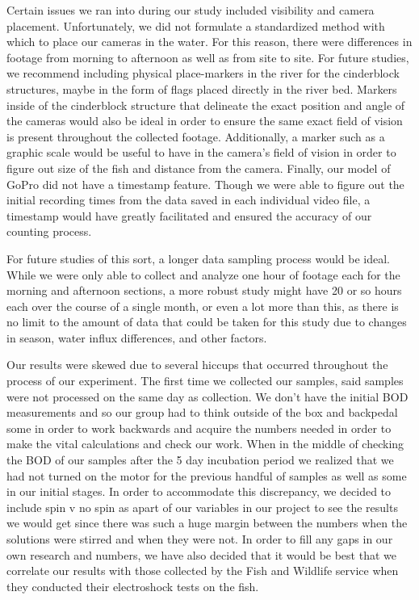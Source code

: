 \documentclass{article}\usepackage[]{graphicx}\usepackage[]{color}
\begin{document}
Certain issues we ran into during our study included visibility and camera placement. Unfortunately, we did not formulate a standardized method with which to place our cameras in the water. For this reason, there were differences in footage from morning to afternoon as well as from site to site. For future studies, we recommend including physical place-markers in the river for the cinderblock structures, maybe in the form of flags placed directly in the river bed. Markers inside of the cinderblock structure that delineate the exact position and angle of the cameras would also be ideal in order to ensure the same exact field of vision is present throughout the collected footage. Additionally, a marker such as a graphic scale would be useful to have in the camera’s field of vision in order to figure out size of the fish and distance from the camera. Finally, our model of GoPro did not have a timestamp feature. Though we were able to figure out the initial recording times from the data saved in each individual video file, a timestamp would have greatly facilitated and ensured the accuracy of our counting process.

For future studies of this sort, a longer data sampling process would be ideal. While we were only able to collect and analyze one hour of footage each for the morning and afternoon sections, a more robust study might have 20 or so hours each over the course of a single month, or even a lot more than this, as there is no limit to the amount of data that could be taken for this study due to changes in season, water influx differences, and other factors.


Our results were skewed due to several hiccups that occurred throughout the process of our experiment. The first time we collected our samples, said samples were not processed on the same day as collection. 
We don’t have the initial BOD measurements and so our group had to think outside of the box and backpedal some in order to work backwards and acquire the numbers needed in order to make the vital calculations and check our work.
When in the middle of checking the BOD of our samples after the 5 day incubation period we realized that we had not turned on the motor for the previous handful of samples as well as some in our initial stages. In order to accommodate this discrepancy, we decided to include spin v no spin as apart of our variables in our project to see the results we would get since there was such a huge margin between the numbers when the solutions were stirred and when they were not.
In order to fill any gaps in our own research and numbers, we have also decided that it would be best that we correlate our results with those collected by the Fish and Wildlife service when they conducted their electroshock tests on the fish. 
\end{document}
